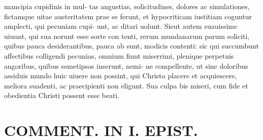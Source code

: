 \documentclass{article}
\begin{document}
\begin{pages}
mancipia cupidinis in mul- tas angustias, solicitudines, dolores ac simulationes, fictamque uitae austeritatem prae se ferunt, et hypocriticam iustitiam coguntur amplecti, qui pecuniam cupi- unt, ac ditari uolunt. Sieut autem suauissime uiuunt, qui sua norunt esse sorte con tenti, rerum mundanarum parum soliciti, quibus pauca desiderantibus, pauca ab sunt, modicis contenti: sic qui succumbunt affectibus colligendi pecunias, omnium fiunt miserrimi, plenique perpetuis angoribus, quibus semetipsos inserunt, nemi- ne compellente, ut sine doloribus assiduis mundo huic uiuere non possint, qui Christo placere et acquiescere, meliora suadenti, ac praecipienti non eligunt. Sua culpa bis miseri, cum fide et obedientia Christi possent esse beati.  \pend
\section*{COMMENT. IN I. EPIST. }
\marginpar{[ p.536 ]}
{}

\end{pages}
\end{document}
